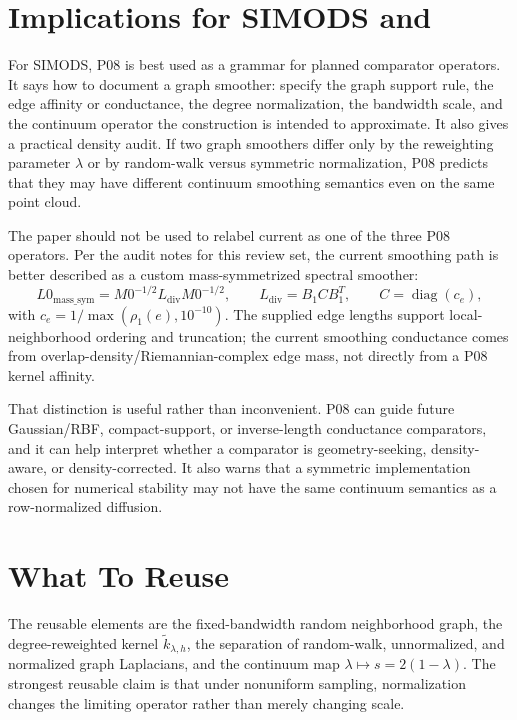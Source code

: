 \documentclass[11pt]{article}
\begin{document}
\section{Implications for SIMODS and }

For SIMODS, P08 is best used as a grammar for planned comparator operators.
It says how to document a graph smoother: specify the graph support rule, the
edge affinity or conductance, the degree normalization, the bandwidth scale,
and the continuum operator the construction is intended to approximate.  It
also gives a practical density audit.  If two graph smoothers differ only by
the reweighting parameter $\lambda$ or by random-walk versus symmetric
normalization, P08 predicts that they may have different continuum smoothing
semantics even on the same point cloud.

The paper should not be used to relabel current 
as one of the three P08 operators.  Per the audit notes for this review set,
the current  smoothing path is better described as a custom
mass-symmetrized spectral smoother:
\[
  L0_{\mathrm{mass\_sym}}
  =
  M0^{-1/2} L_{\mathrm{div}} M0^{-1/2},
  \qquad
  L_{\mathrm{div}} = B_1 C B_1^T,
  \qquad
  C=\operatorname{diag}(c_e),
\]
with $c_e = 1/\max(\rho_1(e),10^{-10})$.  The supplied edge lengths support
local-neighborhood ordering and truncation; the current smoothing conductance
comes from overlap-density/Riemannian-complex edge mass, not directly from a
P08 kernel affinity.

That distinction is useful rather than inconvenient.  P08 can guide future
Gaussian/RBF, compact-support, or inverse-length conductance comparators, and
it can help interpret whether a comparator is geometry-seeking, density-aware,
or density-corrected.  It also warns that a symmetric implementation chosen
for numerical stability may not have the same continuum semantics as a
row-normalized diffusion.

\section{What To Reuse}

The reusable elements are the fixed-bandwidth random neighborhood graph, the
degree-reweighted kernel
$\widetilde{k}_{\lambda,h}$, the separation of random-walk, unnormalized, and
normalized graph Laplacians, and the continuum map
$\lambda\mapsto s=2(1-\lambda)$.  The strongest reusable claim is that under
nonuniform sampling, normalization changes the limiting operator rather than
merely changing scale.
\end{document}
